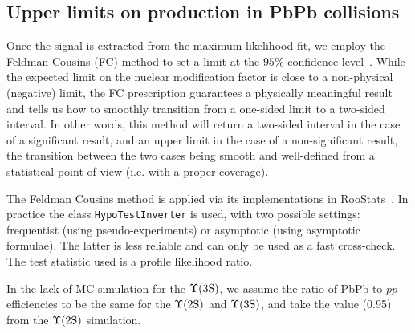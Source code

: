 \subsection{Upper limits on \texorpdfstring{\PgUc}{Y(3S)} production in PbPb collisions}
\label{sec:Y3S}

Once the signal is extracted from the maximum likelihood fit,
we employ the Feldman-Cousins (FC) method to set a limit at the $95\%$ confidence level~\cite{PhysRevD.57.3873}.
While the expected limit on the nuclear modification factor is close to a
non-physical (negative) limit, %
the FC prescription guarantees a physically meaningful result and tells us how to smoothly
transition from a one-sided limit to a two-sided interval. In other words, this method will return a two-sided interval
in the case of a significant result, and an upper limit in the case of a non-significant result, the transition
between the two cases being smooth and well-defined from a statistical point of view (i.e. with
a proper coverage).

The Feldman Cousins method is applied via its implementations in
RooStats~\cite{Moneta:2010pm}. In practice the class \verb-HypoTestInverter- is used, with two possible settings: frequentist
(using pseudo-experiments) or asymptotic (using asymptotic formulae). The latter is less reliable and
can only be used as a fast cross-check. The test statistic used is a profile likelihood ratio.

In the lack of MC simulation for the $\Upsilon\mathrm{(3S)}$, we assume the ratio of PbPb to  $pp$ efficiencies to be the same for the $\Upsilon\mathrm{(2S)}$ and $\Upsilon\mathrm{(3S)}$, and
take the value (0.95) from the $\Upsilon\mathrm{(2S)}$ simulation.

